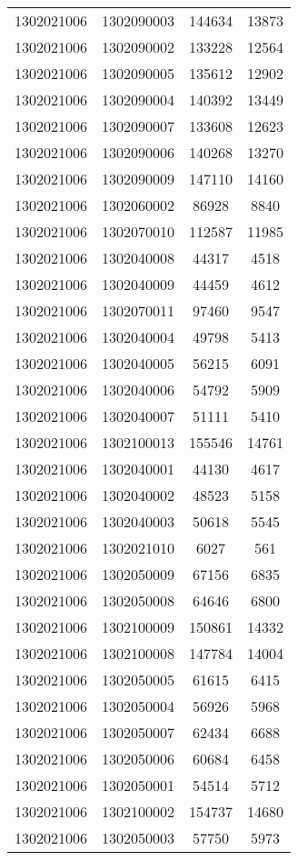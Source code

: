 \begin{longtable}[h]{llcc}
		1302021006 & 1302090003 & 144634 & 13873\\
		1302021006 & 1302090002 & 133228 & 12564\\
		1302021006 & 1302090005 & 135612 & 12902\\
		1302021006 & 1302090004 & 140392 & 13449\\
		1302021006 & 1302090007 & 133608 & 12623\\
		1302021006 & 1302090006 & 140268 & 13270\\
		1302021006 & 1302090009 & 147110 & 14160\\
		1302021006 & 1302060002 & 86928 & 8840\\
		1302021006 & 1302070010 & 112587 & 11985\\
		1302021006 & 1302040008 & 44317 & 4518\\
		1302021006 & 1302040009 & 44459 & 4612\\
		1302021006 & 1302070011 & 97460 & 9547\\
		1302021006 & 1302040004 & 49798 & 5413\\
		1302021006 & 1302040005 & 56215 & 6091\\
		1302021006 & 1302040006 & 54792 & 5909\\
		1302021006 & 1302040007 & 51111 & 5410\\
		1302021006 & 1302100013 & 155546 & 14761\\
		1302021006 & 1302040001 & 44130 & 4617\\
		1302021006 & 1302040002 & 48523 & 5158\\
		1302021006 & 1302040003 & 50618 & 5545\\
		1302021006 & 1302021010 & 6027 & 561\\
		1302021006 & 1302050009 & 67156 & 6835\\
		1302021006 & 1302050008 & 64646 & 6800\\
		1302021006 & 1302100009 & 150861 & 14332\\
		1302021006 & 1302100008 & 147784 & 14004\\
		1302021006 & 1302050005 & 61615 & 6415\\
		1302021006 & 1302050004 & 56926 & 5968\\
		1302021006 & 1302050007 & 62434 & 6688\\
		1302021006 & 1302050006 & 60684 & 6458\\
		1302021006 & 1302050001 & 54514 & 5712\\
		1302021006 & 1302100002 & 154737 & 14680\\
		1302021006 & 1302050003 & 57750 & 5973\\

\end{longtable}
